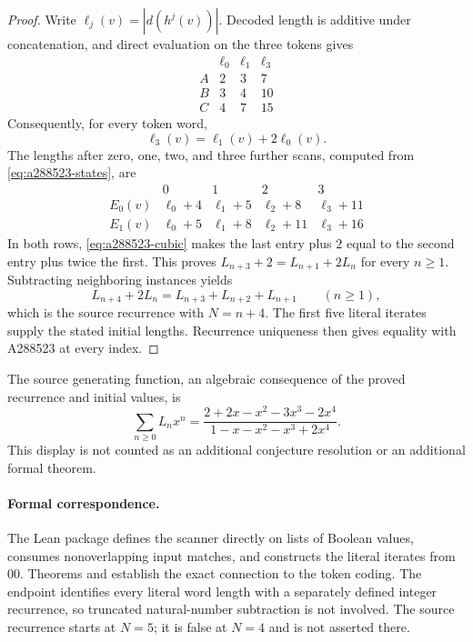 \documentclass[11pt]{article}
\begin{document}
\begin{proof}
Write $\ell_j(v)=|d(h^j(v))|$. Decoded length is additive under
concatenation, and direct evaluation on the three tokens gives
\[
\begin{array}{c|ccc}
 &\ell_0&\ell_1&\ell_3\\\hline
 A&2&3&7\\
 B&3&4&10\\
 C&4&7&15
\end{array}
\]
Consequently, for every token word,
\begin{equation}\label{eq:a288523-cubic}
 \ell_3(v)=\ell_1(v)+2\ell_0(v).
\end{equation}
The lengths after zero, one, two, and three further scans, computed from
\eqref{eq:a288523-states}, are
\[
\begin{array}{c|cccc}
 &0&1&2&3\\\hline
 E_0(v)&\ell_0+4&\ell_1+5&\ell_2+8&\ell_3+11\\
 E_1(v)&\ell_0+5&\ell_1+8&\ell_2+11&\ell_3+16
\end{array}
\]
In both rows, \eqref{eq:a288523-cubic} makes the last entry plus $2$
equal to the second entry plus twice the first. This proves
$L_{n+3}+2=L_{n+1}+2L_n$ for every $n\ge1$. Subtracting neighboring
instances yields
\[
 L_{n+4}+2L_n=L_{n+3}+L_{n+2}+L_{n+1}\qquad(n\ge1),
\]
which is the source recurrence with $N=n+4$. The first five literal
iterates supply the stated initial lengths. Recurrence uniqueness then
gives equality with A288523 at every index.
\end{proof}

The source generating function, an algebraic consequence of the proved
recurrence and initial values, is
\[
 \sum_{n\ge0}L_nx^n=
 \frac{2+2x-x^2-3x^3-2x^4}{1-x-x^2-x^3+2x^4}.
\]
This display is not counted as an additional conjecture resolution or
an additional formal theorem.

\paragraph{Formal correspondence.}
The Lean package defines the scanner directly on lists of Boolean
values, consumes nonoverlapping input matches, and constructs the
literal iterates from $00$. Theorems
 and
 establish the exact connection to
the token coding. The endpoint
 identifies every literal
word length with a separately defined integer recurrence, so truncated
natural-number subtraction is not involved. The source recurrence
starts at $N=5$; it is false at $N=4$ and is not asserted there.
\end{document}
